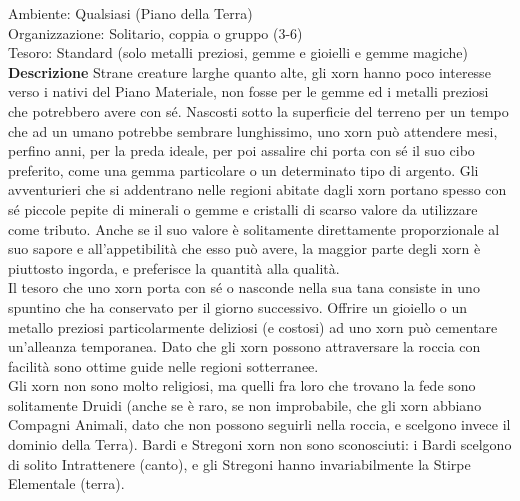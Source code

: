 \begin{multicols}{2}
Ambiente: Qualsiasi (Piano della Terra)\\
Organizzazione: Solitario, coppia o gruppo (3-6)\\
Tesoro: Standard (solo metalli preziosi, gemme e gioielli e gemme magiche)\\
\textbf{Descrizione}
Strane creature larghe quanto alte, gli xorn hanno poco interesse verso i nativi del Piano Materiale, non fosse per le gemme ed i metalli preziosi che potrebbero avere con sé. Nascosti sotto la superficie del terreno per un tempo che ad un umano potrebbe sembrare lunghissimo, uno xorn può attendere mesi, perfino anni, per la preda ideale, per poi assalire chi porta con sé il suo cibo preferito, come una gemma particolare o un determinato tipo di argento. Gli avventurieri che si addentrano nelle regioni abitate dagli xorn portano spesso con sé piccole pepite di minerali o gemme e cristalli di scarso valore da utilizzare come tributo. Anche se il suo valore è solitamente direttamente proporzionale al suo sapore e all'appetibilità che esso può avere, la maggior parte degli xorn è piuttosto ingorda, e preferisce la quantità alla qualità.\\

Il tesoro che uno xorn porta con sé o nasconde nella sua tana consiste in uno spuntino che ha conservato per il giorno successivo. Offrire un gioiello o un metallo preziosi particolarmente deliziosi (e costosi) ad uno xorn può cementare un’alleanza temporanea. Dato che gli xorn possono attraversare la roccia con facilità sono ottime guide nelle regioni sotterranee.\\

Gli xorn non sono molto religiosi, ma quelli fra loro che trovano la fede sono solitamente Druidi (anche se è raro, se non improbabile, che gli xorn abbiano Compagni Animali, dato che non possono seguirli nella roccia, e scelgono invece il dominio della Terra). Bardi e Stregoni xorn non sono sconosciuti: i Bardi scelgono di solito Intrattenere (canto), e gli Stregoni hanno invariabilmente la Stirpe Elementale (terra).\\


\end{multicols}
